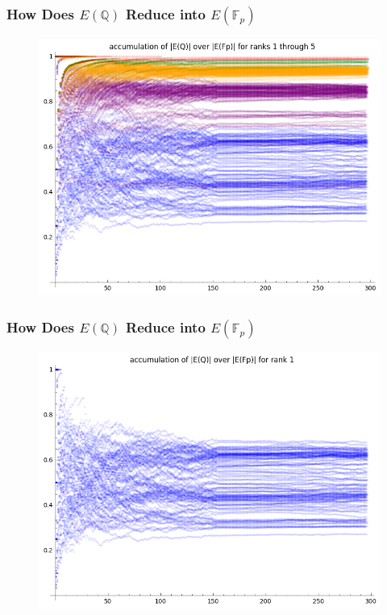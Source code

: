 \documentclass{beamer}
\newcommand{\Q}{\mathbb{Q}}
\newcommand{\F}{\mathbb{F}}
\begin{document}
\begin{frame}
\frametitle{How Does $E(\Q)$ Reduce into $E(\F_p)$}
\begin{figure}[H]
\centering
\includegraphics[width=.8\textwidth]{accumulation_index_huge}
\end{figure}
\end{frame}

\begin{frame}
\frametitle{How Does $E(\Q)$ Reduce into $E(\F_p)$}
\begin{figure}[H]
\centering
\includegraphics[width=.8\textwidth]{accumulation_index_1}
\end{figure}
\end{frame}
\end{document}
